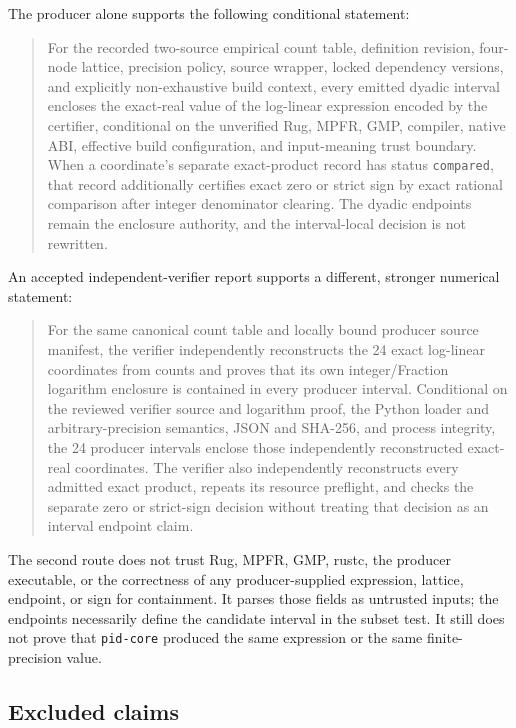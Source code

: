 \documentclass[11pt]{article}
\theoremstyle{definition}
\begin{document}
The producer alone supports the following conditional statement:

\begin{quote}
For the recorded two-source empirical count table, definition revision, four-node lattice,
precision policy, source wrapper, locked dependency versions, and explicitly non-exhaustive build
context, every emitted dyadic interval encloses the exact-real value of the log-linear expression
encoded by the certifier, conditional on the unverified Rug, MPFR, GMP, compiler, native ABI,
effective build configuration, and input-meaning trust boundary.  When a coordinate's separate
exact-product record has status \texttt{compared}, that record additionally certifies exact zero
or strict sign by exact rational comparison after integer denominator clearing.  The dyadic
endpoints remain the enclosure authority, and the interval-local decision is not rewritten.
\end{quote}

An accepted independent-verifier report supports a different, stronger numerical statement:

\begin{quote}
For the same canonical count table and locally bound producer source manifest, the verifier
independently reconstructs the 24 exact log-linear coordinates from counts and proves that its own
integer/Fraction logarithm enclosure is contained in every producer interval.  Conditional on the
reviewed verifier source and logarithm proof, the Python loader and arbitrary-precision semantics,
JSON and SHA-256, and process integrity, the 24 producer intervals enclose those independently
reconstructed exact-real coordinates.  The verifier also independently reconstructs every
admitted exact product, repeats its resource preflight, and checks the separate zero or strict-sign
decision without treating that decision as an interval endpoint claim.
\end{quote}

The second route does not trust Rug, MPFR, GMP, rustc, the producer executable, or the correctness
of any producer-supplied expression, lattice, endpoint, or sign for containment.  It parses those
fields as untrusted inputs; the endpoints necessarily define the candidate interval in the subset
test.  It still does not prove that \texttt{pid-core} produced the same expression or the same
finite-precision value.

\subsection{Excluded claims}
\end{document}
